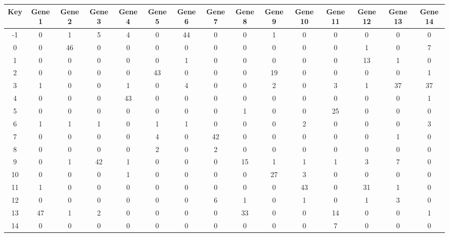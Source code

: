 \begin{tabular}{|c|c|c|c|c|c|c|c|c|c|c|c|c|c|c|}
\hline
Key & Gene 1 & Gene 2 & Gene 3 & Gene 4 & Gene 5 & Gene 6 & Gene 7 & Gene 8 & Gene 9 & Gene 10 & Gene 11 & Gene 12 & Gene 13 & Gene 14 \\
\hline
-1 & 0 & 1 & 5 & 4 & 0 & 44 & 0 & 0 & 1 & 0 & 0 & 0 & 0 & 0 \\
0 & 0 & 46 & 0 & 0 & 0 & 0 & 0 & 0 & 0 & 0 & 0 & 1 & 0 & 7 \\
1 & 0 & 0 & 0 & 0 & 0 & 1 & 0 & 0 & 0 & 0 & 0 & 13 & 1 & 0 \\
2 & 0 & 0 & 0 & 0 & 43 & 0 & 0 & 0 & 19 & 0 & 0 & 0 & 0 & 1 \\
3 & 1 & 0 & 0 & 1 & 0 & 4 & 0 & 0 & 2 & 0 & 3 & 1 & 37 & 37 \\
4 & 0 & 0 & 0 & 43 & 0 & 0 & 0 & 0 & 0 & 0 & 0 & 0 & 0 & 1 \\
5 & 0 & 0 & 0 & 0 & 0 & 0 & 0 & 1 & 0 & 0 & 25 & 0 & 0 & 0 \\
6 & 1 & 1 & 1 & 0 & 1 & 1 & 0 & 0 & 0 & 2 & 0 & 0 & 0 & 3 \\
7 & 0 & 0 & 0 & 0 & 4 & 0 & 42 & 0 & 0 & 0 & 0 & 0 & 1 & 0 \\
8 & 0 & 0 & 0 & 0 & 2 & 0 & 2 & 0 & 0 & 0 & 0 & 0 & 0 & 0 \\
9 & 0 & 1 & 42 & 1 & 0 & 0 & 0 & 15 & 1 & 1 & 1 & 3 & 7 & 0 \\
10 & 0 & 0 & 0 & 1 & 0 & 0 & 0 & 0 & 27 & 3 & 0 & 0 & 0 & 0 \\
11 & 1 & 0 & 0 & 0 & 0 & 0 & 0 & 0 & 0 & 43 & 0 & 31 & 1 & 0 \\
12 & 0 & 0 & 0 & 0 & 0 & 0 & 6 & 1 & 0 & 1 & 0 & 1 & 3 & 0 \\
13 & 47 & 1 & 2 & 0 & 0 & 0 & 0 & 33 & 0 & 0 & 14 & 0 & 0 & 1 \\
14 & 0 & 0 & 0 & 0 & 0 & 0 & 0 & 0 & 0 & 0 & 7 & 0 & 0 & 0 \\
\hline
\end{tabular}